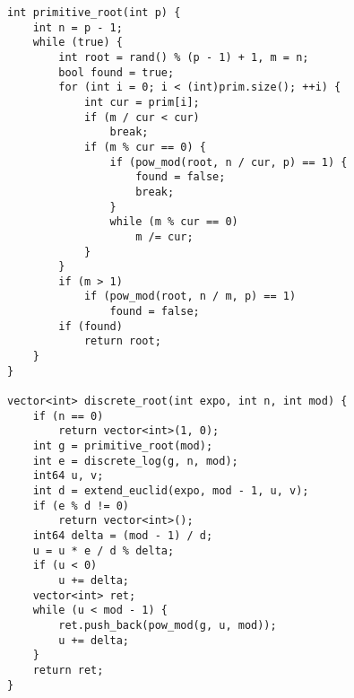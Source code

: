 \begin{lstlisting}
int primitive_root(int p) {
	int n = p - 1;
	while (true) {
		int root = rand() % (p - 1) + 1, m = n;
		bool found = true;
		for (int i = 0; i < (int)prim.size(); ++i) {
			int cur = prim[i];
			if (m / cur < cur)
				break;
			if (m % cur == 0) {
				if (pow_mod(root, n / cur, p) == 1) {
					found = false;
					break;
				}
				while (m % cur == 0)
					m /= cur;
			}
		}
		if (m > 1)
			if (pow_mod(root, n / m, p) == 1)
				found = false;
		if (found)
			return root;
	}
}

vector<int> discrete_root(int expo, int n, int mod) {
	if (n == 0)
		return vector<int>(1, 0);
	int g = primitive_root(mod);
	int e = discrete_log(g, n, mod);
	int64 u, v;
	int d = extend_euclid(expo, mod - 1, u, v);
	if (e % d != 0)
		return vector<int>();
	int64 delta = (mod - 1) / d;
	u = u * e / d % delta;
	if (u < 0)
		u += delta;
	vector<int> ret;
	while (u < mod - 1) {
		ret.push_back(pow_mod(g, u, mod));
		u += delta;
	}
	return ret;
}
\end{lstlisting}
